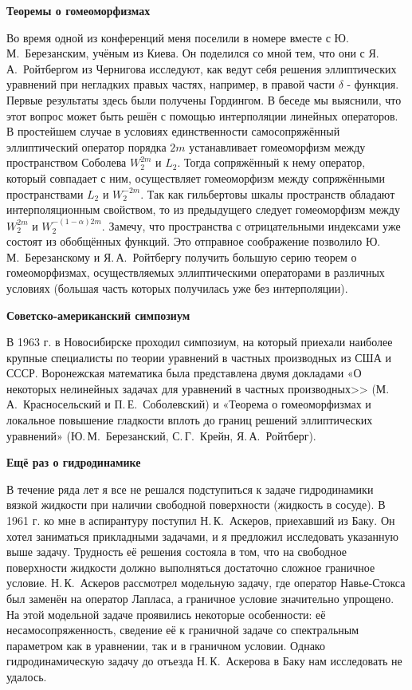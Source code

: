 {\bf Теоремы о гомеоморфизмах}

Во время одной из конференций меня поселили в номере вместе с Ю.\,М.~Березанским, учёным из Киева. Он поделился со мной тем, что они с Я.\,А.~Ройтбергом из Чернигова исследуют, как ведут себя решения эллиптических уравнений при негладких правых частях, например, в правой части $\delta$ - функция. Первые результаты здесь были получены Гордингом. В беседе мы выяснили, что этот вопрос может быть решён с помощью интерполяции линейных операторов. В простейшем случае в условиях единственности самосопряжённый эллиптический оператор порядка $2m$ устанавливает гомеоморфизм между пространством Соболева $W_2^{2m}$ и $L_2$. Тогда сопряжённый к нему оператор, который совпадает с ним, осуществляет гомеоморфизм между сопряжёнными пространствами $L_2$ и $W_2^{-2m}$. Так как гильбертовы шкалы пространств обладают интерполяционным свойством, то из предыдущего следует гомеоморфизм между $W_2^{2m}$ и $W_2^{-(1-\alpha)2m}$. Замечу, что пространства с отрицательными индексами уже состоят из обобщённых функций. Это отправное соображение позволило Ю.\,М.~Березанскому и Я.\,А.~Ройтбергу получить большую серию теорем о гомеоморфизмах, осуществляемых эллиптическими операторами в различных условиях (большая часть которых получилась уже без интерполяции).

{\bf Советско-американский симпозиум}

В 1963 г. в Новосибирске проходил симпозиум,
на который приехали наиболее крупные специалисты по теории уравнений в частных производных из США и СССР.
Воронежская математика была представлена двумя докладами «О некоторых нелинейных задачах для уравнений в частных производных>>
(М.\,А.~Красносельский и П.\,Е.~Соболевский) и «Теорема о гомеоморфизмах и локальное повышение гладкости вплоть до границ решений эллиптических уравнений»
 (Ю.\,М.~Березанский, С.\,Г.~Крейн, Я.\,А.~Ройтберг).

{\bf Ещё раз о гидродинамике}

В течение ряда лет я все не решался подступиться к задаче гидродинамики вязкой жидкости при наличии свободной поверхности (жидкость в сосуде). В 1961 г. ко мне в аспирантуру поступил Н.\,К.~Аскеров, приехавший из Баку. Он хотел заниматься прикладными задачами, и я предложил исследовать указанную выше задачу. Трудность её решения состояла в том, что на свободное поверхности жидкости должно выполняться достаточно сложное граничное условие. Н.\,К.~Аскеров рассмотрел модельную задачу, где оператор Навье-Стокса был заменён на оператор Лапласа, а граничное условие значительно упрощено. На этой модельной задаче проявились некоторые особенности: её несамосопряженность, сведение её к граничной задаче со спектральным параметром как в уравнении, так и в граничном условии. Однако гидродинамическую задачу до отъезда Н.\,К.~Аскерова в Баку нам исследовать не удалось.

